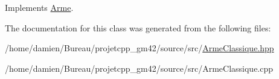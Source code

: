 Implements \hyperlink{classArme_a2092f960c2fb796bea3d9887775fa90e}{Arme}.



The documentation for this class was generated from the following files\-:\begin{DoxyCompactItemize}
\item 
/home/damien/\-Bureau/projetcpp\-\_\-gm42/source/src/\hyperlink{ArmeClassique_8hpp}{Arme\-Classique.\-hpp}\item 
/home/damien/\-Bureau/projetcpp\-\_\-gm42/source/src/Arme\-Classique.\-cpp\end{DoxyCompactItemize}
